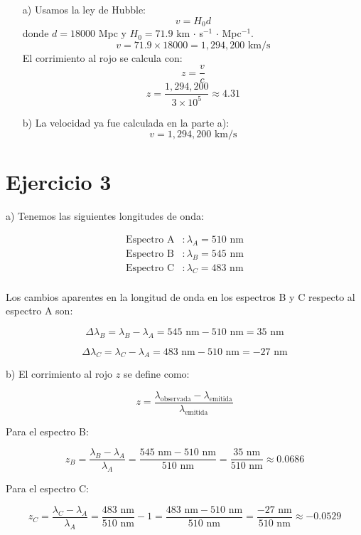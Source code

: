\documentclass[12pt]{article}
\begin{document}
\begin{enumerate}
    \item[a)] 
      Usamos la ley de Hubble:
    \[
    v = H_0 d
    \]
    donde \( d = 18000 \) Mpc y \( H_0 = 71.9 \) km $\cdot$ s\(^{-1}\) $\cdot$ Mpc\(^{-1}\).
    \[
    v = 71.9 \times 18000 = 1,294,200 \text{ km/s}
    \]
    El corrimiento al rojo se calcula con:
    \[
    z = \frac{v}{c}
    \]
    \[
    z = \frac{1,294,200}{3 \times 10^5} \approx 4.31
    \]
    
    \item[b)]
      La velocidad ya fue calculada en la parte a):
    \[
    v = 1,294,200 \text{ km/s}
    \]
\end{enumerate}

\section*{Ejercicio 3}

a)
Tenemos las siguientes longitudes de onda:

\begin{align*}
\text{Espectro A} & : \lambda_A = 510 \text{ nm} \\
\text{Espectro B} & : \lambda_B = 545 \text{ nm} \\
\text{Espectro C} & : \lambda_C = 483 \text{ nm} \\
\end{align*}

Los cambios aparentes en la longitud de onda en los espectros B y C respecto al espectro A son:

\[
\Delta \lambda_B = \lambda_B - \lambda_A = 545 \text{ nm} - 510 \text{ nm} = 35 \text{ nm}
\]

\[
\Delta \lambda_C = \lambda_C - \lambda_A = 483 \text{ nm} - 510 \text{ nm} = -27 \text{ nm}
\]

b) 
El corrimiento al rojo \( z \) se define como:

\[
z = \frac{\lambda_{\text{observada}} - \lambda_{\text{emitida}}}{\lambda_{\text{emitida}}}
\]

Para el espectro B:

\[
z_B = \frac{\lambda_B - \lambda_A}{\lambda_A} = \frac{545 \text{ nm} - 510 \text{ nm}}{510 \text{ nm}} = \frac{35 \text{ nm}}{510 \text{ nm}} \approx 0.0686
\]

Para el espectro C:

\[
z_C = \frac{\lambda_C - \lambda_A}{\lambda_A} = \frac{483 \text{ nm}}{510 \text{ nm}} - 1 = \frac{483 \text{ nm} - 510 \text{ nm}}{510 \text{ nm}} = \frac{-27 \text{ nm}}{510 \text{ nm}} \approx -0.0529
\]
\end{document}
